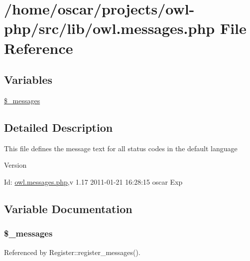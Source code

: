 \section{/home/oscar/projects/owl-\/php/src/lib/owl.messages.php File Reference}
\label{owl_8messages_8php}
\subsection*{Variables}
\begin{DoxyCompactItemize}
\item 
\hyperlink{owl_8messages_8php_a5caca00ffca4d529cdbb748a61f4b015}{\$\_\-messages}
\end{DoxyCompactItemize}


\subsection{Detailed Description}
This file defines the message text for all status codes in the default language \begin{DoxyVersion}{Version}

\end{DoxyVersion}
\begin{DoxyParagraph}{Id:}
\hyperlink{owl_8messages_8php}{owl.messages.php},v 1.17 2011-\/01-\/21 16:28:15 oscar Exp 
\end{DoxyParagraph}


\subsection{Variable Documentation}
\subsubsection[{\$\_\-messages}]{\setlength{\rightskip}{0pt plus 5cm}\$\_\-messages}\label{owl_8messages_8php_a5caca00ffca4d529cdbb748a61f4b015}


Referenced by Register::register\_\-messages().

